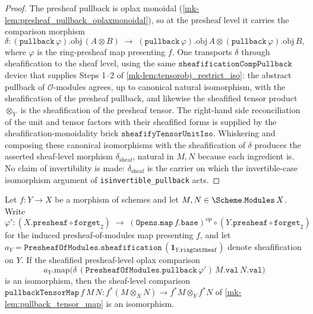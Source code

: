 \begin{proof}
  \leanok
  The presheaf pullback is oplax monoidal (\ref{mk-lem:presheaf_pullback_oplaxmonoidal}),
  so at the presheaf level it carries the comparison morphism
  \[
    \delta : (\mathtt{pullback}\,\varphi).\mathrm{obj}\,(A \otimes B)
      \;\longrightarrow\;
      (\mathtt{pullback}\,\varphi).\mathrm{obj}\,A
        \otimes (\mathtt{pullback}\,\varphi).\mathrm{obj}\,B,
  \]
  where \(\varphi\) is the ring-presheaf map presenting \(f\). One transports \(\delta\)
  through sheafification to the sheaf level, using the same
  \(\mathtt{sheafificationCompPullback}\) device that supplies Steps 1--2 of
  \ref{mk-lem:tensorobj_restrict_iso}: the abstract pullback of \(\mathcal{O}\)-modules
  agrees, up to canonical natural isomorphism, with the sheafification of the presheaf
  pullback, and likewise the sheafified tensor product \(\otimes_Y\) is the
  sheafification of the presheaf tensor. The right-hand side reconciliation of the unit
  and tensor factors with their sheafified forms is supplied by the
  sheafification-monoidality brick \(\mathtt{sheafifyTensorUnitIso}\). Whiskering and
  composing these canonical isomorphisms with the sheafification of \(\delta\) produces
  the asserted sheaf-level morphism \(\delta_{\mathrm{sheaf}}\), natural in \(M, N\)
  because each ingredient is. No claim of invertibility is made: \(\delta_{\mathrm{sheaf}}\)
  is the carrier on which the invertible-case isomorphism argument of
  \texttt{isinvertible\_pullback} acts.
\end{proof}

\begin{lemma}\label{mk-lem:isiso_pullbacktensormap_of_sheafifydelta}
  \leanok

  Let \(f : Y \to X\) be a morphism of schemes and let
  \(M, N \in \Scheme.\mathtt{Modules}\,X\). Write
  \[
    \varphi' :
      (X.\mathtt{presheaf} \circ \mathtt{forget}_2)
      \;\longrightarrow\;
      (\mathtt{Opens.map}\,f.\mathtt{base})^{\mathrm{op}}
        \circ (Y.\mathtt{presheaf} \circ \mathtt{forget}_2)
  \]
  for the induced presheaf-of-modules map presenting \(f\), and let
  \(a_Y = \mathtt{PresheafOfModules.sheafification}\,(\mathbf{1}_{Y.\mathtt{ringCatSheaf}})\)
  denote sheafification on \(Y\). If the sheafified presheaf-level oplax comparison
  \[
    a_Y.\mathrm{map}\bigl(
      \delta\,(\mathtt{PresheafOfModules.pullback}\,\varphi')\,M.\mathtt{val}\,N.\mathtt{val}
    \bigr)
  \]
  is an isomorphism, then the sheaf-level comparison
  \(\mathtt{pullbackTensorMap}\,f\,M\,N : f^*(M \otimes_X N) \to f^*M \otimes_Y f^*N\)
  of \ref{mk-lem:pullback_tensor_map} is an isomorphism.
\end{lemma}

